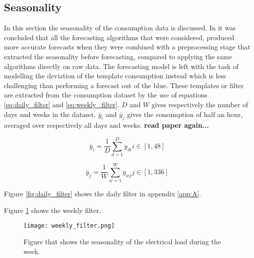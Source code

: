  


\subsection{Seasonality}
In this section the seasonality of the consumption data is discussed. In \cite{Hoverstad2015}it was concluded that all the forecasting algorithms that were considered, produced more accurate forecasts when they were combined with a preprocessing stage that extracted the seasonality before forecasting, compared to applying the same algorithms directly on raw data. The forecasting model is left with the task of modelling the deviation of the template consumption instead which is less challenging than performing a forecast out of the blue. These templates or filter are extracted from the consumption dataset by the use of equations \ref{eq:daily_filter} and \ref{eq:weekly_filter}. $ D $ and $ W $ gives respectively the number of days and weeks in the dataset. $\bar{y}_i$ and $\bar{y}_j$ gives the consumption of half an hour, averaged over respectively all days and weeks.   \textbf{read paper again...}

\begin{equation}\label{eq:daily_filter}
	\bar{y}_i = \frac{1}{D} \sum_{d=1}^D y_{di} i \in [1,48]
\end{equation} 

\begin{equation}\label{eq:weekly_filter}
	\bar{y}_j = \frac{1}{W} \sum_{w=1}^W y_{wj}  j \in [1,336]
\end{equation} 



Figure \ref{fig:daily_filter} shows the daily filter in appendix \ref{app:A}. 

Figure \ref{fig:weekly_filter} shows the weekly filter.

\begin{figure}[h!]
	\centering
	\texttt{[image: weekly\_filter.png]}
	\caption{Figure that shows the seasonality of the electrical load during the week.}
	\label{fig:weekly_filter}
\end{figure}

